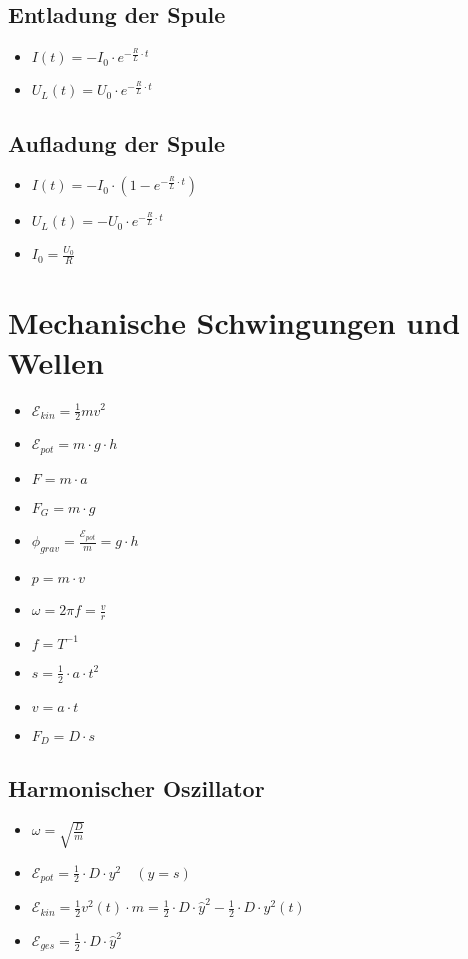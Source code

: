 \documentclass[paper = a4, twocolumn]{scrartcl}
\DeclareRobustCommand{\E}{\mathcal{E}}
\begin{document}
\subsection{Entladung der Spule}
\begin{itemize}
\item
	\( I(t) = -I_0 \cdot e^{-\frac{R}{L} \cdot t} \)
\item
	\( U_L(t) = U_0 \cdot e^{-\frac{R}{L} \cdot t} \)
\end{itemize}

\subsection{Aufladung der Spule}
\begin{itemize}
\item
	\( I(t) = -I_0 \cdot (1 - e^{-\frac{R}{L} \cdot t} ) \)
\item
	\( U_L(t) = -U_0 \cdot e^{-\frac{R}{L} \cdot t} \)
\item
	\( I_0 = \frac{U_0}{R} \)
\end{itemize}

\section{Mechanische Schwingungen und Wellen}
\begin{itemize}
\item
	\( \E_{kin} = \frac{1}{2} m v^2 \)
\item
	\( \E_{pot} = m \cdot g \cdot h \)
\item
	\( F = m \cdot a \)
\item
	\( F_G = m \cdot g \)
\item
	\( \phi_{grav} = \frac{\E_{pot}}{m} = g \cdot h \)
\item
	\( p = m \cdot v \)
\item
	\( \omega = 2 \pi f = \frac{v}{r} \)
\item
	\( f = T^{-1} \)
\item
	\( s = \frac{1}{2} \cdot a \cdot t^2 \)
\item
	\( v = a \cdot t \)
\item
	\( F_D = D \cdot s \)
\end{itemize}

\subsection{Harmonischer Oszillator}
\begin{itemize}
\item
	\( \omega = \sqrt{\frac{D}{m}} \)
\item
	\( \E_{pot} = \frac{1}{2} \cdot D \cdot y^2 \quad (y = s) \)
\item
	\( \E_{kin} = \frac{1}{2} v^2(t) \cdot m = \frac{1}{2} \cdot D \cdot
	\hat{y}^2 - \frac{1}{2} \cdot D \cdot y^2(t) \)
\item
	\( \E_{ges} = \frac{1}{2} \cdot D \cdot \hat{y}^2 \)
\end{itemize}
\end{document}
